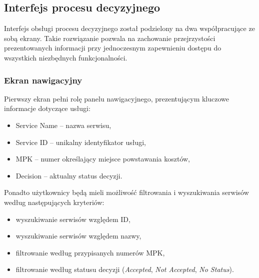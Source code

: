 \subsection{Interfejs procesu decyzyjnego}
Interfejs obsługi procesu decyzyjnego został podzielony na dwa współpracujące ze sobą ekrany. Takie rozwiązanie pozwala na zachowanie przejrzystości prezentowanych informacji przy jednoczesnym zapewnieniu dostępu do wszystkich niezbędnych funkcjonalności.

\subsubsection{Ekran nawigacyjny}
Pierwszy ekran pełni rolę panelu nawigacyjnego, prezentującym kluczowe informacje dotyczące usługi:
\begin{itemize}
    \item Service Name -- nazwa serwisu,
    \item Service ID -- unikalny identyfikator usługi,
    \item MPK -- numer określający miejsce powstawania kosztów,
    \item Decision -- aktualny status decyzji.
\end{itemize}
Ponadto użytkownicy będą mieli możliwość filtrowania i wyszukiwania serwisów według następujących kryteriów:
\begin{itemize}
    \item wyszukiwanie serwisów względem ID,
    \item wyszukiwanie serwisów względem nazwy,
    \item filtrowanie według przypisanych numerów MPK,
    \item filtrowanie według statusu decyzji (\emph{Accepted}, \emph{Not Accepted}, \emph{No Status}).
\end{itemize}

